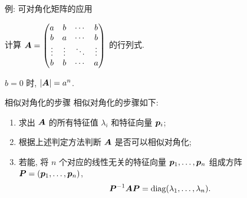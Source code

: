 \begin{frame}{例: 可对角化矩阵的应用}
	\onslide<+->
	\begin{example}
		计算 ${\boldsymbol{A}}=\begin{pmatrix}
			a&b&\cdots&b\\
			b&a&\cdots&b\\
			\vdots&\vdots&\ddots&\vdots\\
			b&b&\cdots&a
		\end{pmatrix}$ 的行列式.
	\end{example}
	\onslide<+->
	\begin{solution}
		$b=0$ 时, $|{\boldsymbol{A}}|=a^n$.
		\onslide<+->{%
			\[|\bfA|=\bigl(nb-(b-a)\bigr)(a-b)^{n-1}=(a-b)^{n-1}(nb-b+a).\]
			\vspace{-\baselineskip}
		}
	\end{solution}
\end{frame}


\begin{frame}{相似对角化的步骤}
	\onslide<+->
	相似对角化的步骤如下:
	\begin{enumerate}
		\item 求出 ${\boldsymbol{A}}$ 的所有特征值 $\lambda_i$ 和特征向量 ${\boldsymbol{p}}_i$;
		\item 根据上述判定方法判断 ${\boldsymbol{A}}$ 是否可以相似对角化;
		\item 若能, 将 $n$ 个对应的线性无关的特征向量 ${\boldsymbol{p}}_1,\dots,{\boldsymbol{p}}_n$ 组成方阵 ${\boldsymbol{P}}=({\boldsymbol{p}}_1,\dots,{\boldsymbol{p}}_n)$, 
		\[{\boldsymbol{P}}^{-1}{\boldsymbol{A}}{\boldsymbol{P}}={\mathrm{diag}}(\lambda_1,\dots,\lambda_n).\]
	\end{enumerate}
\end{frame}


